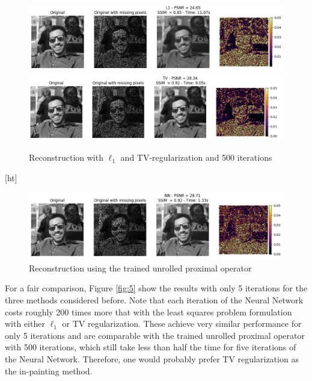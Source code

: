 \documentclass{article}
\begin{document}
\begin{enumerate}[label=2.\arabic*]
    \begin{figure}[ht]
        \centering
        \includegraphics[trim={3.5cm 2cm 3cm 2cm},clip,width=\textwidth]{img/reconstruction_l1.png}
        \includegraphics[trim={3.5cm 2cm 3cm 2cm},clip,width=\textwidth]{img/reconstruction_tv.png}
        \caption{Reconstruction with $\ell_1$ and TV-regularization and 500 iterations}
        \label{fig:rec_500}
    \end{figure}[ht]
    \begin{figure}
        \centering
        \includegraphics[trim={3.5cm 2cm 3cm 2cm},clip,width=\textwidth]{img/reconstruction_nn.png}
        \caption{Reconstruction using the trained unrolled proximal operator}
        \label{fig:rec_nn}
    \end{figure}
    
    For a fair comparison, Figure \ref{fig:5} show the results with only 5 iterations for the three methods considered before. Note that each iteration of the Neural Network costs roughly 200 times more that with the least squares problem formulation with either $\ell_1$ or TV regularization. These achieve very similar performance for only 5 iterations and are comparable with the trained unrolled proximal operator with 500 iterations, which still take less than half the time for five iterations of the Neural Network. Therefore, one would probably prefer TV regularization as the in-painting method.
    

\end{enumerate}
\end{document}
